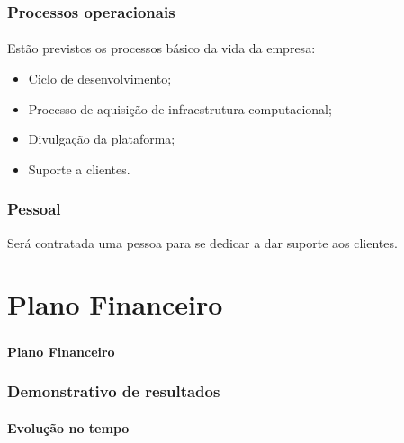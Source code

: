 \documentclass{beamer}
\begin{document}
\begin{frame}
  \frametitle{Processos operacionais}
  \framesubtitle{}

  Estão previstos os processos básico da vida da empresa:
  \begin{itemize}
    \item Ciclo de desenvolvimento;
    \item Processo de aquisição de infraestrutura computacional;
    \item Divulgação da plataforma;
    \item Suporte a clientes.
  \end{itemize}

\end{frame}

\begin{frame}
  \frametitle{Pessoal}

  Será contratada uma pessoa para se dedicar a dar suporte aos clientes.

\end{frame}

\section{Plano Financeiro}
\begin{frame}
  \frametitle{}
  \framesubtitle{}

  \begin{center}
    {\huge\textbf{Plano Financeiro}}
  \end{center}
\end{frame}

\begin{frame}
  \frametitle{Demonstrativo de resultados}
  \framesubtitle{Evolução no tempo}

  \begin{center}
  \end{center}
\end{frame}
\end{document}
